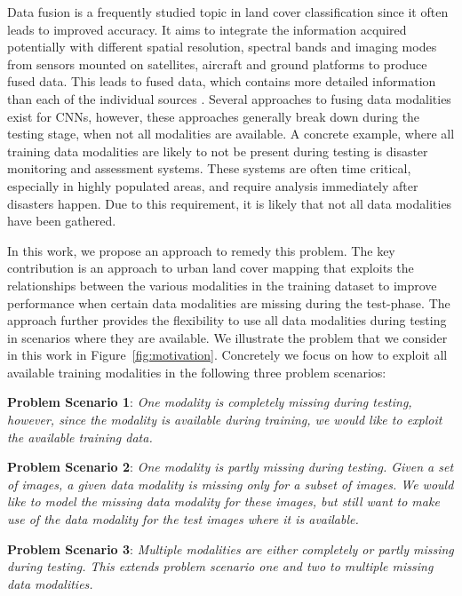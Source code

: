 \documentclass[journal]{IEEEtran}
\begin{document}
Data fusion is a frequently studied topic in land cover classification since it often leads to improved accuracy. It aims to integrate the information acquired potentially with different spatial resolution, spectral bands and imaging modes from sensors mounted on satellites, aircraft and ground platforms to produce fused data. This leads to fused data, which contains more detailed information than each of the individual sources \cite{zhang2010, bovolo2015}. Several approaches to fusing data modalities exist for CNNs, however, these approaches generally break down during the testing stage, when not all modalities are available. A concrete example, where all training data modalities are likely to not be present during testing is disaster monitoring and assessment systems. These systems are often time critical, especially in highly populated areas, and require analysis immediately after disasters happen. Due to this requirement, it is likely that not all data modalities have been gathered.

In this work, we propose an approach to remedy this problem. The key contribution is an approach to urban land cover mapping that exploits the relationships between the various modalities in the training dataset to improve performance when certain data modalities are missing during the test-phase. The approach further provides the flexibility to use all data modalities during testing in scenarios where they are available. We illustrate the problem that we consider in this work in Figure~\ref{fig:motivation}. Concretely we focus on how to exploit all available training modalities in the following three problem scenarios:

{\bf Problem Scenario 1}: \emph{One modality is completely missing during testing, however, since the modality is available during training, we would like to exploit the available training data.}

{\bf Problem Scenario 2}: \emph{One modality is partly missing during testing. Given a set of images, a given data modality is missing only for a subset of images. We would like to model the missing data modality for these images, but still want to make use of the data modality for the test images where it is available.}

{\bf Problem Scenario 3}: \emph{Multiple modalities are either completely or partly missing during testing. This extends problem scenario one and two to multiple missing data modalities.}
\end{document}
